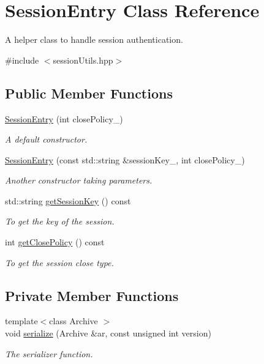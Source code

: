 \hypertarget{classSessionEntry}{
\section{SessionEntry Class Reference}
\label{classSessionEntry}
}


A helper class to handle session authentication.  




{\ttfamily \#include $<$sessionUtils.hpp$>$}

\subsection*{Public Member Functions}
\begin{DoxyCompactItemize}
\item 
\hyperlink{classSessionEntry_a7d5a905eb39caa7528b46fe2c45a614b}{SessionEntry} (int closePolicy\_)
\begin{DoxyCompactList}\small\item\em A default constructor. \item\end{DoxyCompactList}\item 
\hyperlink{classSessionEntry_a9188d39b7557ec039a9be03cf917bf6a}{SessionEntry} (const std::string \&sessionKey\_\-, int closePolicy\_)
\begin{DoxyCompactList}\small\item\em Another constructor taking parameters. \item\end{DoxyCompactList}\item 
std::string \hyperlink{classSessionEntry_a507a7bc46193a1771e5468578fbb6e63}{getSessionKey} () const 
\begin{DoxyCompactList}\small\item\em To get the key of the session. \item\end{DoxyCompactList}\item 
int \hyperlink{classSessionEntry_ae3630c2cde55b8bfcac0a459d18a14cc}{getClosePolicy} () const 
\begin{DoxyCompactList}\small\item\em To get the session close type. \item\end{DoxyCompactList}\end{DoxyCompactItemize}
\subsection*{Private Member Functions}
\begin{DoxyCompactItemize}
\item 
{\footnotesize template$<$class Archive $>$ }\\void \hyperlink{classSessionEntry_a55822664dec4de4fe28824d2765d9f96}{serialize} (Archive \&ar, const unsigned int version)
\begin{DoxyCompactList}\small\item\em The serializer function. \item\end{DoxyCompactList}\end{DoxyCompactItemize}
